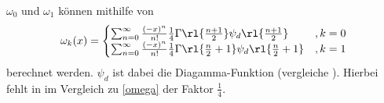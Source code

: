 $\omega_0$ und $\omega_1$ können mithilfe von
%
\begin{align}\label{omega}
\omega_k(x)=\begin{cases}
\sum_{n=0}^{\infty}\frac{(-x)^n}{n!}\frac{1}{4}\Gamma\rl{\frac{n+1}{2}}
\psi_d\rl{\frac{n+1}{2}}&,
k=0\\
\sum_{n=0}^{\infty}\frac{(-x)^n}{n!}\frac{1}{4}\Gamma\rl{\frac{n}{2}+1}
\psi_d\rl{\frac{n}{2}+1}&,
k=1\\
\end{cases}
\end{align}
%
berechnet werden. $\psi_d$ ist dabei die Diagamma-Funktion 
(vergleiche \cite{av:1a2}). Hierbei fehlt in \cite{av:1a2} im 
Vergleich zu \ref{omega} der Faktor $\frac{1}{4}$.